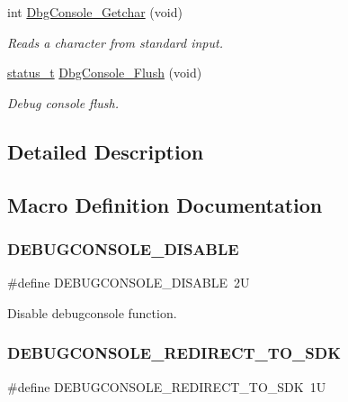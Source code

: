\begin{DoxyCompactItemize}
int \mbox{\hyperlink{group__debugconsole_ga11898c5015274863741c4f3f4d9edc08}{Dbg\+Console\+\_\+\+Getchar}} (void)
\begin{DoxyCompactList}\small\item\em Reads a character from standard input. \end{DoxyCompactList}\item 
\mbox{\hyperlink{group__ksdk__common_gaaabdaf7ee58ca7269bd4bf24efcde092}{status\+\_\+t}} \mbox{\hyperlink{group__debugconsole_ga3194467c3dae6c5015b8b29c3cc1db1e}{Dbg\+Console\+\_\+\+Flush}} (void)
\begin{DoxyCompactList}\small\item\em Debug console flush. \end{DoxyCompactList}\end{DoxyCompactItemize}


\subsection{Detailed Description}


\subsection{Macro Definition Documentation}
\mbox{\label{group__debugconsole_gaf8f85fd102e4aedcee3d061dc2d3e0c2}} 
\subsubsection{\texorpdfstring{DEBUGCONSOLE\_DISABLE}{DEBUGCONSOLE\_DISABLE}}
{\footnotesize\ttfamily \#define D\+E\+B\+U\+G\+C\+O\+N\+S\+O\+L\+E\+\_\+\+D\+I\+S\+A\+B\+LE~2U}

Disable debugconsole function. \mbox{\label{group__debugconsole_gac33031f28afa29dc8fe1718bbc86ee23}} 
\subsubsection{\texorpdfstring{DEBUGCONSOLE\_REDIRECT\_TO\_SDK}{DEBUGCONSOLE\_REDIRECT\_TO\_SDK}}
{\footnotesize\ttfamily \#define D\+E\+B\+U\+G\+C\+O\+N\+S\+O\+L\+E\+\_\+\+R\+E\+D\+I\+R\+E\+C\+T\+\_\+\+T\+O\+\_\+\+S\+DK~1U}

